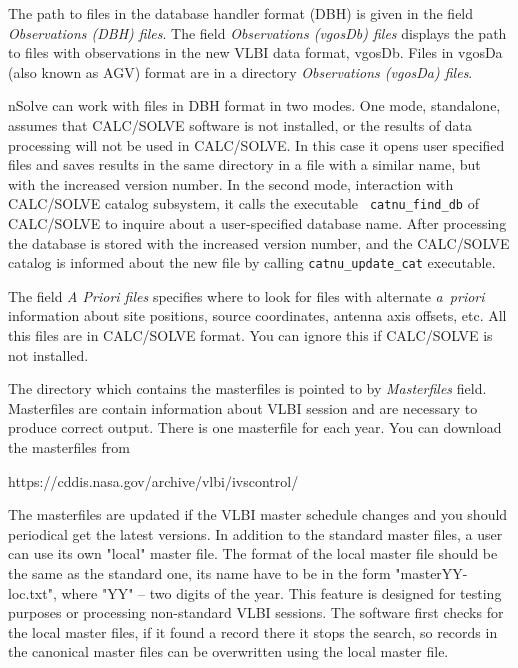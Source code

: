 \documentclass [10pt,letterpaper]{report}
\newcommand{\nuSolve}{\greektext n\latintext Solve}
\begin{document}
{The path to files in the database handler format (DBH) is given in the
field {\sl Observations (DBH) files}. The field {\sl Observations
(vgosDb) files} displays the path to files with observations in the
new VLBI data format, vgosDb. Files in vgosDa (also known as AGV) format
are in a directory {\sl Observations (vgosDa) files}.

\nuSolve{} can work with files in DBH
format in two modes. One mode, standalone, assumes that  CALC/SOLVE
software is not installed, or the results of data processing will not be
used in CALC/SOLVE. In this case it opens user specified files and saves
results in the same directory in a file with a similar name, but with
the increased version number. In the second mode, interaction with
CALC/SOLVE catalog subsystem, it calls the executable {\tt
catnu\_find\_db} of CALC/SOLVE to inquire about a user-specified
database name. After processing the database is stored with the increased
version number, and the CALC/SOLVE catalog is informed about the new
file by calling {\tt catnu\_update\_cat} executable.

The field {\sl A Priori files} specifies where to look for files with
alternate {\it a~priori} information about site positions, source
coordinates, antenna axis offsets, etc. All this files are in CALC/SOLVE
format. You can ignore this if CALC/SOLVE is not installed.

The directory which contains the masterfiles is pointed to by {\sl
Masterfiles} field. Masterfiles are contain information about VLBI
session and are necessary to produce correct output. There is one
masterfile for each year. You can download the masterfiles from
\begin{center}
{\tt

https://cddis.nasa.gov/archive/vlbi/ivscontrol/

}
\end{center}
\noindent
The masterfiles are updated if the VLBI master schedule changes and you
should periodical get the latest versions. In addition to the standard master
files, a user can use its own "local" master file. The format of the local master
file should be the same as the standard one, its name have to be in the form
"masterYY-loc.txt", where "YY" -- two digits of the year. This feature is designed
for testing purposes or processing non-standard VLBI sessions. The software first
checks for the local master files, if it found a record there it stops the search,
so records in the canonical master files can be overwritten using the local
master file.

}
\end{document}
